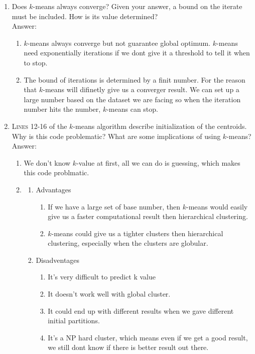 \documentclass{article}
\begin{document}
\begin{enumerate}
\item Does $k$-means always converge? Given your answer, a bound on the iterate must be included.  How is its value determined?\\
Answer:
\begin{enumerate}
	\item $k$-means always converge but not guarantee global optimum. $k$-means need exponentially iterations if we dont give it a threshold to tell it when to stop.
	\item The bound of iterations is determined by a finit number. For the reason that $k$-means will difinetly give us a converger result. We can set up a large number based on the dataset we are facing so when the iteration number hits the number, $k$-means can stop.
\end{enumerate}
\item \textsc{Lines} 12-16 of the $k$-means algorithm describe initialization of the centroids.  Why is this code problematic?  What are some implications of using $k$-means?   \\
Answer:\\
\begin{enumerate}
	\item We don't know $k$-value at first, all we can do is guessing, which makes this code problmatic.
	\item
	\begin{enumerate}
		\item Advantages
		\begin{enumerate}
			\item If we have a large set of base number, then $k$-means would easily give us a faster computational result then hierarchical clustering.
			\item $k$-means could give us a tighter clusters then hierarchical clustering, especially when the clusters are globular.
		\end{enumerate}
		\item Disadventages
		\begin{enumerate}
			\item It's very difficult to predict k value
			\item It doesn't work well with global cluster.
			\item It could end up with different results when we gave different initial partitions.
			\item It's a NP hard cluster, which means even if we get a good result, we still dont know if there is better result out there.

\end{enumerate}
\end{enumerate}
\end{enumerate}
\end{enumerate}
\end{document}
